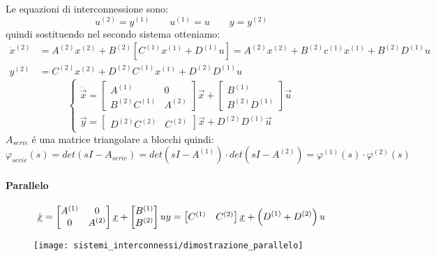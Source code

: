 \documentclass[../main.tex]{subfiles}
\begin{document}
			Le equazioni di interconnessione sono:
			\[
				u^{(2)} = y^{(1)} \qquad u^{(1)} = u \qquad y = y^{(2)}
			\]
			quindi sostituendo nel secondo sistema otteniamo:
			\[
				\begin{aligned}
					\dot x^{(2)} &= A^{(2)} x^{(2)} + B^{(2)} \left[ C^{(1)} x^{(1)} + D^{(1)} u \right] = A^{(2)} x^{(2)} + B^{(2)} c^{(1)} x^{(1)} + B^{(2)} D^{(1)} u
					\\
					y^{(2)} &= C^{(2)} x^{(2)} + D^{(2)} C^{(1)} x^{(1)} + D^{(2)} D^{(1)} u
				\end{aligned}
			\]
			\[
				\begin{cases}
						\dot{\vec x} =
						\begin{bmatrix}
							A^{(1)} & 0\\
							B^{(2)} C^{(1)} & A^{(2)}
						\end{bmatrix} \vec x +
						\begin{bmatrix}
							B^{(1)}\\
							B^{(2)} D^{(1)}
						\end{bmatrix} \vec u
						\\
						\vec y =
						\begin{bmatrix}
							D^{(2)} C^{(2)} & C^{(2)}
						\end{bmatrix} \vec x + 
						D^{(2)} D^{(1)} \vec u
				\end{cases}
			\]
			$ A_{serie} $ \'e una matrice triangolare a blocchi quindi:
			\[
				\varphi_{serie}(s) = det(sI-A_{serie}) = det(sI-A^{(1)}) \cdot det(sI-A^{(2)}) = \varphi^{(1)}(s) \cdot \varphi^{(2)}(s)
			\]
		\paragraph{Parallelo}
			\[
				\dot{\vec x} = 
				\begin{bmatrix}
					A^{(1)} & 0\\
					0 & A^{(2)}
				\end{bmatrix} \vec x +
				\begin{bmatrix}
					B^{(1)}\\
					B^{(2)}
				\end{bmatrix} u
				\\
				y = 
				\begin{bmatrix}
					C^{(1)} & C^{(2)}
				\end{bmatrix} \vec x +
				\left( D^{(1)} + D^{(2)} \right) u
			\]
			\begin{figure}[H]
				\centering\texttt{[image: sistemi\_interconnessi/dimostrazione\_parallelo]}
			\end{figure}
		
\end{document}
